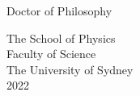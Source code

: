 \begin{titlepage}
\begin{center}
\begin{large}
\vspace{0.1in}

Doctor of Philosophy

\vspace{0.1in}

The School of Physics\\
Faculty of Science\\
The University of Sydney\\
2022

\end{large}

\end{center}
\end{titlepage}
